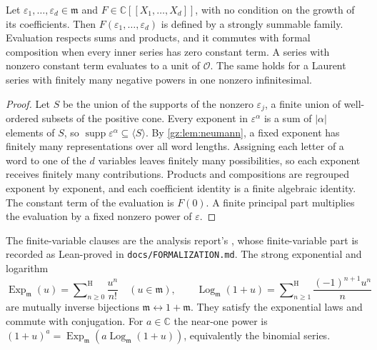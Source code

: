\documentclass[11pt,a4paper]{article}
\numberwithin{equation}{section}
\theoremstyle{definition}
\theoremstyle{remark}
\newcommand{\C}{\mathbb C}
\newcommand{\OO}{\mathcal O}
\newcommand{\mm}{\mathfrak m}
\newcommand{\eps}{\varepsilon}
\newcommand{\supp}{\operatorname{supp}}
\newcommand{\Ex}{\operatorname{Exp}_{\mm}}
\newcommand{\Lgm}{\operatorname{Log}_{\mm}}
\newcommand{\Sh}{\mathop{\textstyle\sum}\nolimits^{\mathrm H}}
\newcommand{\src}[1]{\textup{[#1]}}
\begin{document}
\begin{lemma}[Infinitesimal substitution \src{01--06}]\label{gz:lem:substitution}
Let $\eps_1,\dots,\eps_d\in\mm$ and $F\in\C[[X_1,\dots,X_d]]$, with no
condition on the growth of its coefficients. Then $F(\eps_1,\dots,\eps_d)$
is defined by a strongly summable family. Evaluation respects sums and
products, and it commutes with formal composition when every inner series
has zero constant term. A series with nonzero constant term evaluates to a
unit of $\OO$. The same holds for a Laurent series with finitely many
negative powers in one nonzero infinitesimal.
\end{lemma}
\begin{proof}
Let $S$ be the union of the supports of the nonzero $\eps_j$, a finite
union of well-ordered subsets of the positive cone. Every exponent in
$\eps^\alpha$ is a sum of $|\alpha|$ elements of $S$, so
$\supp\eps^\alpha\subseteq\langle S\rangle$. By \cref{gz:lem:neumann}, a
fixed exponent has finitely many representations over all word lengths.
Assigning each letter of a word to one of the $d$ variables leaves finitely
many possibilities, so each exponent receives finitely many
contributions. Products and compositions are regrouped exponent by
exponent, and each coefficient identity is a finite algebraic identity.
The constant term of the evaluation is $F(0)$. A finite principal part
multiplies the evaluation by a fixed nonzero power of $\eps$.
\end{proof}
The finite-variable clauses are the analysis report's ,
whose finite-variable part is recorded as Lean-proved in
\texttt{docs/FORMALIZATION.md}. The strong exponential and logarithm
\[
\Ex(u)=\Sh_{n\ge0}\frac{u^n}{n!}\quad(u\in\mm),\qquad
\Lgm(1+u)=\Sh_{n\ge1}\frac{(-1)^{n+1}u^n}{n}
\]
are mutually inverse bijections $\mm\leftrightarrow1+\mm$. They satisfy
the exponential laws and commute with conjugation. For $a\in\C$ the
near-one power is $(1+u)^a=\Ex(a\Lgm(1+u))$, equivalently the binomial
series.
\end{document}
